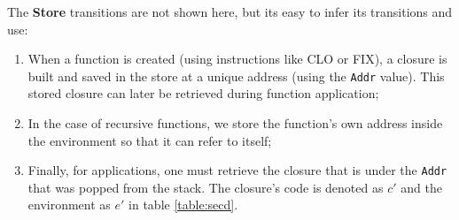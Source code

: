 The \textbf{Store} transitions are not shown here, but its easy to infer its transitions and use:
\begin{enumerate}
  \item When a function is created (using instructions like CLO or FIX), a closure is built and saved in 
    the store at a unique address (using the \texttt{Addr} value). This stored closure can later be 
    retrieved during function application;
  \item In the case of recursive functions, we store the function's own address inside the environment 
    so that it can refer to itself;
  \item Finally, for applications, one must retrieve the closure that is under the \texttt{Addr} that was popped
    from the stack. The closure's code is denoted as \( c' \) and the environment as \( e' \) in table \ref{table:secd}.
\end{enumerate}

